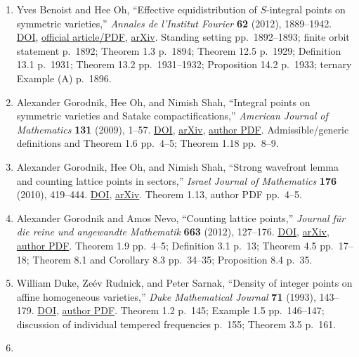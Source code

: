 \begin{enumerate}
\def\labelenumi{\arabic{enumi}.}

\item
  Yves Benoist and Hee Oh, ``Effective equidistribution of \(S\)-integral points on symmetric varieties,'' \emph{Annales de l'Institut Fourier} \textbf{62} (2012), 1889--1942. \href{https://doi.org/10.5802/aif.2738}{DOI}, \href{https://www.numdam.org/item/AIF_2012__62_5_1889_0/}{official article/PDF}, \href{https://arxiv.org/abs/0706.1621}{arXiv}. Standing setting pp.~1892--1893; finite orbit statement p.~1892; Theorem 1.3 p.~1894; Theorem 12.5 p.~1929; Definition 13.1 p.~1931; Theorem 13.2 pp.~1931--1932; Proposition 14.2 p.~1933; ternary Example (A) p.~1896.
\item
  Alexander Gorodnik, Hee Oh, and Nimish Shah, ``Integral points on symmetric varieties and Satake compactifications,'' \emph{American Journal of Mathematics} \textbf{131} (2009), 1--57. \href{https://doi.org/10.1353/ajm.0.0034}{DOI}, \href{https://arxiv.org/abs/math/0610497}{arXiv}, \href{https://gauss.math.yale.edu/~ho2/doc/satake_ajm.pdf}{author PDF}. Admissible/generic definitions and Theorem 1.6 pp.~4--5; Theorem 1.18 pp.~8--9.
\item
  Alexander Gorodnik, Hee Oh, and Nimish Shah, ``Strong wavefront lemma and counting lattice points in sectors,'' \emph{Israel Journal of Mathematics} \textbf{176} (2010), 419--444. \href{https://doi.org/10.1007/s11856-010-0035-8}{DOI}, \href{https://arxiv.org/abs/0708.3188}{arXiv}. Theorem 1.13, author PDF pp.~4--5.
\item
  Alexander Gorodnik and Amos Nevo, ``Counting lattice points,'' \emph{Journal für die reine und angewandte Mathematik} \textbf{663} (2012), 127--176. \href{https://doi.org/10.1515/CRELLE.2011.096}{DOI}, \href{https://arxiv.org/abs/0903.1515}{arXiv}, \href{https://www.math.uzh.ch/gorodnik/papers/GN2-final.pdf}{author PDF}. Theorem 1.9 pp.~4--5; Definition 3.1 p.~13; Theorem 4.5 pp.~17--18; Theorem 8.1 and Corollary 8.3 pp.~34--35; Proposition 8.4 p.~35.
\item
  William Duke, Zeév Rudnick, and Peter Sarnak, ``Density of integer points on affine homogeneous varieties,'' \emph{Duke Mathematical Journal} \textbf{71} (1993), 143--179. \href{https://doi.org/10.1215/S0012-7094-93-07107-4}{DOI}, \href{https://www.math.ucla.edu/~wdduke/preprints/density.pdf}{author PDF}. Theorem 1.2 p.~145; Example 1.5 pp.~146--147; discussion of individual tempered frequencies p.~155; Theorem 3.5 p.~161.
\item

\end{enumerate}
